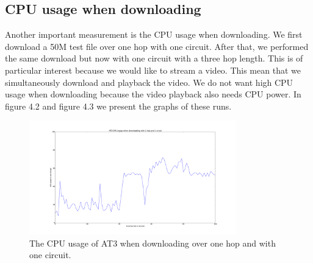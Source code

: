 		\subsection{CPU usage when downloading}
			Another important measurement is the CPU usage when downloading. We first download a 50M test file over one hop with one circuit. After that, we performed the same download but now with one circuit with a three hop length. This is of particular interest because we would like to stream a video. This mean that we simultaneously download and playback the video. We do not want high CPU usage when downloading because the video playback also needs CPU power. In figure 4.2 and figure 4.3 we present the graphs of these runs.
			
			\begin{figure}[!t]
				\centering
				\includegraphics[width=0.8\textwidth]{graphics/cpu_usage_1_hop_1_circuit.pdf}
				\caption{The CPU usage of AT3 when downloading over one hop and with one circuit.}
				\label{fig:cpu_idle_graph}
			\end{figure}